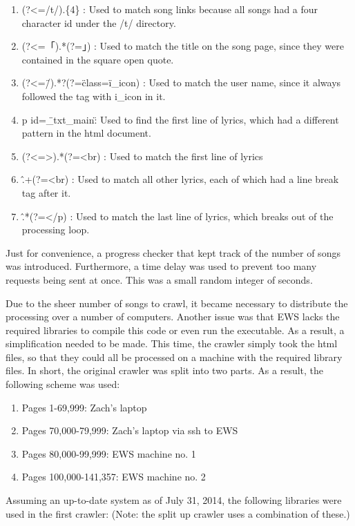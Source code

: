 \documentclass{acm} %
\begin{document}
\begin{CJK}{UTF8}{zhsong}
\begin{enumerate}
 \item (?<=/t/).\{4\} : Used to match song links because all songs had a four character id under the /t/ directory.
 \item (?<=「).*(?=」) : Used to match the title on the song page, since they were contained in the square open quote.
 \item (?<=\"/).*?(?=\" class=\"i\_icon) : Used to match the user name, since it always followed the tag with i\_icon in it.
 \item p id=\"\_txt\_main\" : Used to find the first line of lyrics, which had a different pattern in the html document.
 \item (?<=>).*(?=<br) : Used to match the first line of lyrics
 \item \^.+(?=<br) : Used to match all other lyrics, each of which had a line break tag after it.
 \item \^.*(?=</p) : Used to match the last line of lyrics, which breaks out of the processing loop.
\end{enumerate}

Just for convenience, a progress checker that kept track of the number of songs was introduced. Furthermore, a time delay was used to prevent too many requests being sent at once. This was a small random integer of seconds.

Due to the sheer number of songs to crawl, it became necessary to distribute the processing over a number of computers. Another issue was that EWS lacks the required libraries to compile this code or even run the executable. As a result, a simplification needed to be made. This time, the crawler simply took the html files, so that they could all be processed on a machine with the required library files. In short, the original crawler was split into two parts. As a result, the following scheme was used:

\begin{enumerate}
 \item Pages 1-69,999: Zach's laptop
 \item Pages 70,000-79,999: Zach's laptop via ssh to EWS
 \item Pages 80,000-99,999: EWS machine no. 1
 \item Pages 100,000-141,357: EWS machine no. 2
\end{enumerate}

Assuming an up-to-date system as of July 31, 2014, the following libraries were used in the first crawler: (Note: the split up crawler uses a combination of these.)


\end{CJK}
\end{document}
